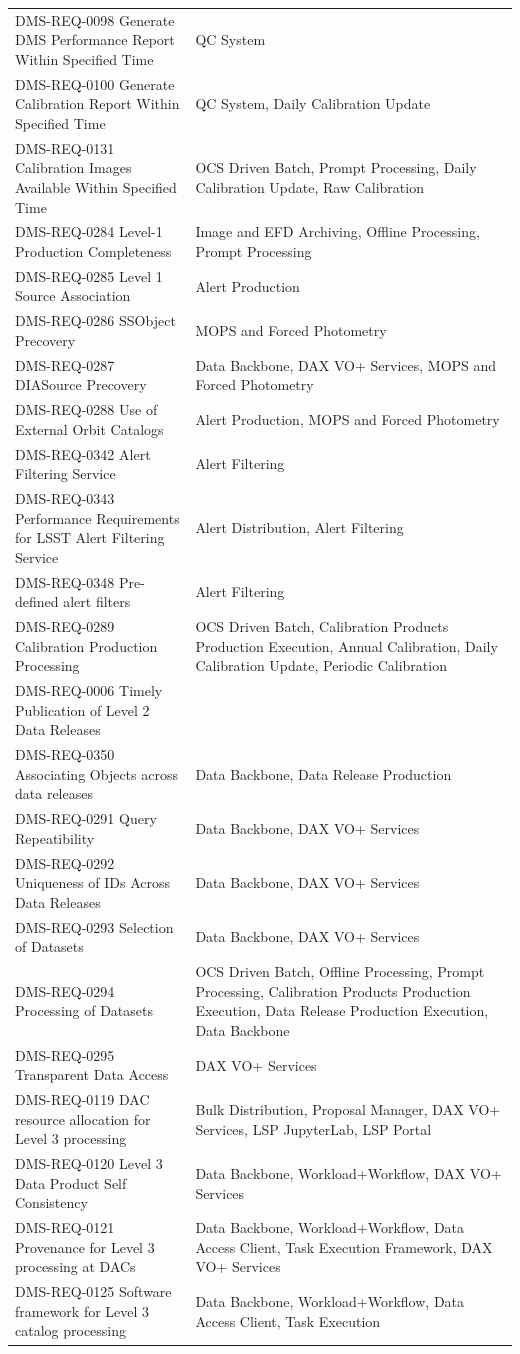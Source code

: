 \documentclass[]{article}
\begin{document}
\begin{longtable}[]{@{}ll@{}}
DMS-REQ-0098 Generate DMS Performance Report Within Specified Time & QC
System\tabularnewline
DMS-REQ-0100 Generate Calibration Report Within Specified Time & QC
System, Daily Calibration Update\tabularnewline
DMS-REQ-0131 Calibration Images Available Within Specified Time & OCS
Driven Batch, Prompt Processing, Daily Calibration Update, Raw
Calibration\tabularnewline
DMS-REQ-0284 Level-1 Production Completeness & Image and EFD Archiving,
Offline Processing, Prompt Processing\tabularnewline
DMS-REQ-0285 Level 1 Source Association & Alert
Production\tabularnewline
DMS-REQ-0286 SSObject Precovery & MOPS and Forced
Photometry\tabularnewline
DMS-REQ-0287 DIASource Precovery & Data Backbone, DAX VO+ Services, MOPS
and Forced Photometry\tabularnewline
DMS-REQ-0288 Use of External Orbit Catalogs & Alert Production, MOPS and
Forced Photometry\tabularnewline
DMS-REQ-0342 Alert Filtering Service & Alert Filtering\tabularnewline
DMS-REQ-0343 Performance Requirements for LSST Alert Filtering Service &
Alert Distribution, Alert Filtering\tabularnewline
DMS-REQ-0348 Pre-defined alert filters & Alert Filtering\tabularnewline
DMS-REQ-0289 Calibration Production Processing & OCS Driven Batch,
Calibration Products Production Execution, Annual Calibration, Daily
Calibration Update, Periodic Calibration\tabularnewline
DMS-REQ-0006 Timely Publication of Level 2 Data Releases
&\tabularnewline
DMS-REQ-0350 Associating Objects across data releases & Data Backbone,
Data Release Production\tabularnewline
DMS-REQ-0291 Query Repeatibility & Data Backbone, DAX VO+
Services\tabularnewline
DMS-REQ-0292 Uniqueness of IDs Across Data Releases & Data Backbone, DAX
VO+ Services\tabularnewline
DMS-REQ-0293 Selection of Datasets & Data Backbone, DAX VO+
Services\tabularnewline
DMS-REQ-0294 Processing of Datasets & OCS Driven Batch, Offline
Processing, Prompt Processing, Calibration Products Production
Execution, Data Release Production Execution, Data
Backbone\tabularnewline
DMS-REQ-0295 Transparent Data Access & DAX VO+ Services\tabularnewline
DMS-REQ-0119 DAC resource allocation for Level 3 processing & Bulk
Distribution, Proposal Manager, DAX VO+ Services, LSP JupyterLab, LSP
Portal\tabularnewline
DMS-REQ-0120 Level 3 Data Product Self Consistency & Data Backbone,
Workload+Workflow, DAX VO+ Services\tabularnewline
DMS-REQ-0121 Provenance for Level 3 processing at DACs & Data Backbone,
Workload+Workflow, Data Access Client, Task Execution Framework, DAX VO+
Services\tabularnewline
DMS-REQ-0125 Software framework for Level 3 catalog processing & Data
Backbone, Workload+Workflow, Data Access Client, Task Execution

\end{longtable}
\end{document}
